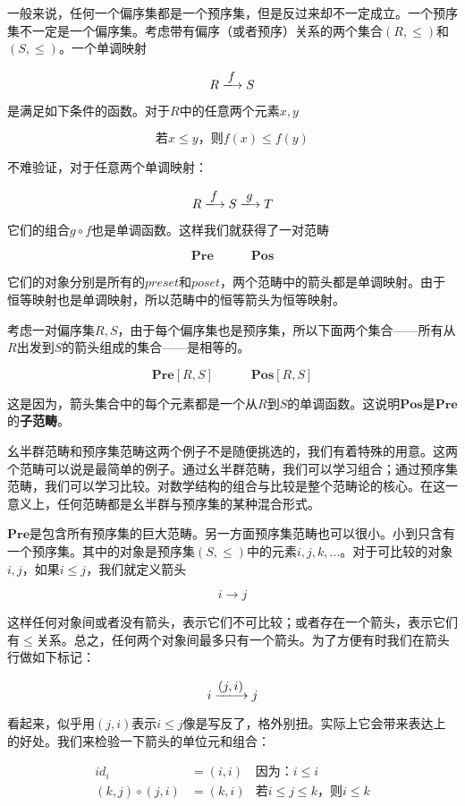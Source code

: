 \documentclass{article}
\begin{document}
一般来说，任何一个偏序集都是一个预序集，但是反过来却不一定成立。一个预序集不一定是一个偏序集。考虑带有偏序（或者预序）关系的两个集合$(R, \leq)$和$(S, \leq)$。一个单调映射

\[
R \arrowto{f} S
\]

是满足如下条件的函数。对于$R$中的任意两个元素$x, y$

\[
\text{若} x \leq y \text{，则} f(x) \leq f(y)
\]

不难验证，对于任意两个单调映射：

\[
R \arrowto{f} S \arrowto{g} T
\]

它们的组合$g \circ f$也是单调函数。这样我们就获得了一对范畴

\[
\pmb{Pre} \quad \quad \quad \pmb{Pos}
\]

它们的对象分别是所有的$preset$和$poset$，两个范畴中的箭头都是单调映射。由于恒等映射也是单调映射，所以范畴中的恒等箭头为恒等映射。

考虑一对偏序集$R, S$，由于每个偏序集也是预序集，所以下面两个集合——所有从$R$出发到$S$的箭头组成的集合——是相等的。

\[
\pmb{Pre}[R, S] \quad \quad \quad \pmb{Pos}[R, S]
\]

这是因为，箭头集合中的每个元素都是一个从$R$到$S$的单调函数。这说明$\pmb{Pos}$是$\pmb{Pre}$的\textbf{子范畴}。

幺半群范畴和预序集范畴这两个例子不是随便挑选的，我们有着特殊的用意。这两个范畴可以说是最简单的例子。通过幺半群范畴，我们可以学习组合；通过预序集范畴，我们可以学习比较。对数学结构的组合与比较是整个范畴论的核心。在这一意义上，任何范畴都是幺半群与预序集的某种混合形式\cite{Simmons2011}。

$\pmb{Pre}$是包含所有预序集的巨大范畴。另一方面预序集范畴也可以很小。小到只含有一个预序集。其中的对象是预序集$(S, \leq)$中的元素$i, j, k, ...$。对于可比较的对象$i, j$，如果$i \leq j$，我们就定义箭头

\[
i \longrightarrow j
\]

这样任何对象间或者没有箭头，表示它们不可比较；或者存在一个箭头，表示它们有$\leq$关系。总之，任何两个对象间最多只有一个箭头。为了方便有时我们在箭头行做如下标记：

\[
i \arrowto{(j, i)} j
\]

看起来，似乎用$(j, i)$表示$i \leq j$像是写反了，格外别扭。实际上它会带来表达上的好处。我们来检验一下箭头的单位元和组合：

\[
\begin{array}{rll}
id_i & = (i, i) & \text{因为：} i \leq i \\
(k, j) \circ (j, i) & = (k, i) & \text{若} i \leq j \leq k \text{，则} i \leq k
\end{array}
\]
\end{document}
